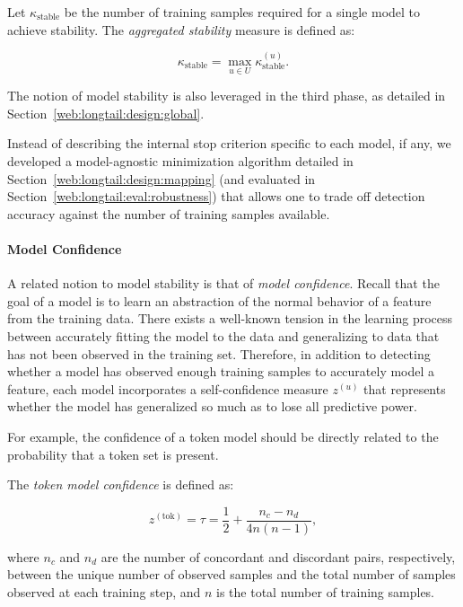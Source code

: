 \begin{definition}
   Let $\kappa_{\text{stable}}$ be the number of training samples required for a single model to achieve stability. The \emph{aggregated stability} measure is defined as:

   \begin{equation}
     \kappa_{\text{stable}}=\max_{u\in
       U}\kappa_{\text{stable}}^{\left(u\right)}.
   \end{equation}
\end{definition}

The notion of model stability is also leveraged in the third phase, as detailed in Section~\ref{web:longtail:design:global}.

\begin{note}
  Instead of describing the internal stop criterion specific to each
  model, if any, we developed a model-agnostic minimization algorithm
  detailed in Section~\ref{web:longtail:design:mapping} (and evaluated
  in Section~\ref{web:longtail:eval:robustness}) that allows one to
  trade off detection accuracy against the number of training samples
  available.
\end{note}

\paragraph{Model Confidence}
\label{web:longtail:design:enhanced-training:confidence}
A related notion to model stability is that of \emph{model confidence}.  Recall that the goal of a model is to learn an abstraction of the normal behavior of a feature from the training data.  There exists a well-known tension in the learning process between accurately fitting the model to the data and generalizing to data that has not been observed in the training set.  Therefore, in addition to detecting whether a model has observed enough training samples to accurately model a feature, each model incorporates a self-confidence measure $z^{\left(u\right)}$ that represents whether the model has generalized so much as to lose all predictive power.

For example, the confidence of a token model should be directly related to the probability that a token set is present.

\begin{definition}
  The \emph{token model confidence} is defined as:

\begin{equation}
  z^{\left(\text{tok}\right)}=\tau=\frac{1}{2}+\frac{n_c-n_d}{4n\left(n-1\right)},
\end{equation}

where $n_c$ and $n_d$ are the number of concordant and discordant pairs, respectively, between the unique number of observed samples and the total number of samples observed at each training step, and $n$ is the total number of training samples.
\end{definition}

